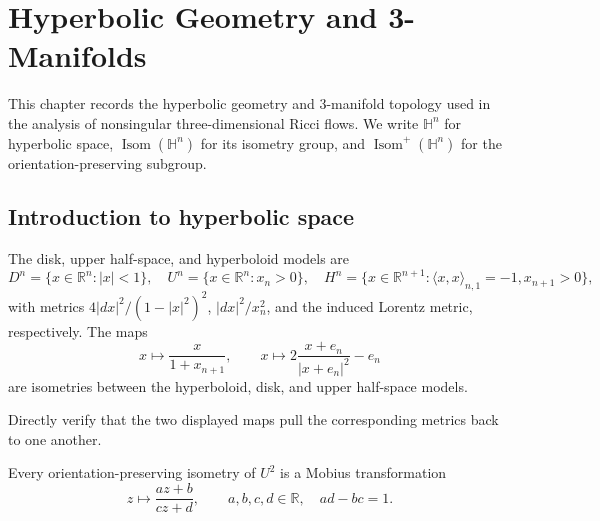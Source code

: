 \chapter{Hyperbolic Geometry and 3-Manifolds}
\label{ch:chow-iv-hyperbolic-geometry-3-manifolds}

This chapter records the hyperbolic geometry and 3-manifold topology used in
the analysis of nonsingular three-dimensional Ricci flows.  We write
\(\mathbb H^n\) for hyperbolic space, \(\operatorname{Isom}(\mathbb H^n)\)
for its isometry group, and \(\operatorname{Isom}^+(\mathbb H^n)\) for the
orientation-preserving subgroup.

\section{Introduction to hyperbolic space}

\begin{definition}
\label{def:chow-iv-hyperbolic-models}
The disk, upper half-space, and hyperboloid models are
\[
 D^n=\{x\in\mathbb R^n:|x|<1\},\quad
 U^n=\{x\in\mathbb R^n:x_n>0\},\quad
 H^n=\{x\in\mathbb R^{n+1}:\langle x,x\rangle_{n,1}=-1, x_{n+1}>0\},
\]
with metrics \(4|dx|^2/(1-|x|^2)^2\), \(|dx|^2/x_n^2\), and the induced
Lorentz metric, respectively.  The maps
\[
 x\mapsto \frac{x}{1+x_{n+1}},\qquad
 x\mapsto 2\frac{x+e_n}{|x+e_n|^2}-e_n
\]
are isometries between the hyperboloid, disk, and upper half-space models.
\end{definition}

\begin{claim}
\label{ex:chow-iv-hyperbolic-model-isometries}
Directly verify that the two displayed maps pull the corresponding metrics
back to one another.
\end{claim}

\begin{lemma}
\label{lem:chow-iv-hyperbolic-plane-isometries}
Every orientation-preserving isometry of \(U^2\) is a Mobius transformation
\[
 z\longmapsto \frac{az+b}{cz+d},\qquad a,b,c,d\in\mathbb R,\quad ad-bc=1.
\]
\end{lemma}

